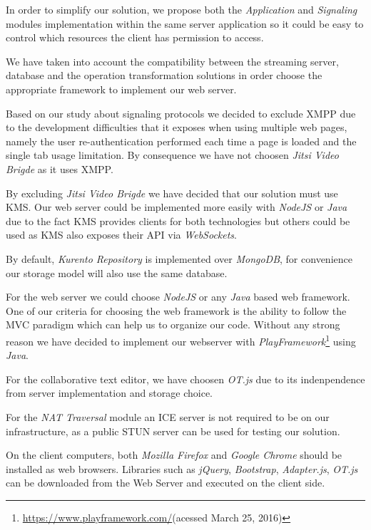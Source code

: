 In order to simplify our solution, we propose both the \emph{Application} and \emph{Signaling} modules implementation within the same server application so it could be easy to control which resources the client has permission to access. 
 
We have taken into account the compatibility between the streaming server, database and the operation transformation solutions in order choose the appropriate framework to implement our web server.

Based on our study about signaling protocols we decided to exclude \ac{XMPP} due to the development difficulties that it exposes when using multiple web pages, namely the user re-authentication performed each time a page is loaded and the single tab usage limitation. By consequence we have not choosen \emph{Jitsi Video Brigde} as it uses \ac{XMPP}.

By excluding \emph{Jitsi Video Brigde} we have decided that our solution must use \ac{KMS}. Our web server could be implemented more easily with \emph{NodeJS} or \emph{Java} due to the fact \ac{KMS} provides clients for both technologies but others could be used as \ac{KMS} also exposes their \ac{API} via \emph{WebSockets}.

By default, \emph{Kurento Repository} is implemented over \emph{MongoDB}, for convenience our storage model will also use the same database. 

For the web server we could choose \emph{NodeJS} or any \emph{Java} based web framework. One of our criteria for choosing the web framework is the ability to follow the \ac{MVC} paradigm which can help us to organize our code. Without any strong reason we have decided to implement our webserver with \emph{PlayFramework}\footnote{\url{https://www.playframework.com/}(acessed March 25, 2016)} using \emph{Java}.

For the collaborative text editor, we have choosen \emph{OT.js} due to its indenpendence from server implementation and storage choice.

For the \emph{NAT Traversal} module an \ac{ICE} server is not required to be on our infrastructure, as a public \ac{STUN} server can be used for testing our solution. 

On the client computers, both \emph{Mozilla Firefox} and \emph{Google Chrome} should be installed as web browsers. Libraries such as \emph{jQuery}, \emph{Bootstrap}, \emph{Adapter.js}, \emph{OT.js} can be downloaded from the Web Server and executed on the client side.

